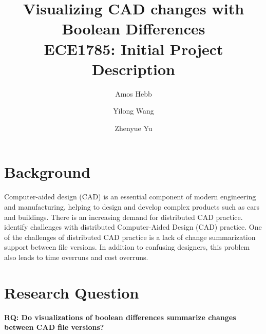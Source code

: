 \documentclass[sigconf,authorversion,nonacm]{acmart}
\begin{document}
\title{Visualizing CAD changes with Boolean Differences\\
{\normalsize ECE1785: Initial Project Description}}

\author{Amos Hebb}
\author{Yilong Wang}
\author{Zhenyue Yu}
\makeatletter
\def\@ACM@checkaffil{%
	\if@ACM@instpresent\else
		\ClassWarningNoLine{\@classname}{No institution present for an affiliation}%
	\fi
	\if@ACM@citypresent\else
		\ClassWarningNoLine{\@classname}{No city present for an affiliation}%
	\fi
	\if@ACM@countrypresent\else
		\ClassWarningNoLine{\@classname}{No country present for an affiliation}%
	\fi
}
\makeatother

\maketitle

\section{Background}

Computer-aided design (CAD) is an essential component of modern engineering and manufacturing, helping to design and develop complex products such as cars and buildings. There is an increasing demand for distributed CAD practice. \citet{cheng2023age} identify challenges with distributed Computer-Aided Design (CAD) practice. One of the challenges of distributed CAD practice is a lack of change summarization support between file versions. In addition to confusing designers, this problem also leads to time overruns and cost overruns.

\section{Research Question}

\textbf{RQ: Do visualizations of boolean differences summarize changes between CAD file versions?}
\end{document}
